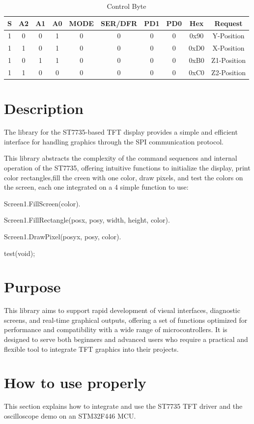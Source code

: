 \documentclass[pdflatex,sn-mathphys-num]{sn-jnl}%
\begin{document}
\begin{table}[!h]
	\centering
	\caption{Control Byte}
	\begin{tabular}{cccccccc|c|c}
		S & A2 & A1 & A0 & MODE & SER/DFR & PD1 & PD0 & Hex & Request\\ 
        \hline
		1 & 0 & 0 & 1 & 0 & 0 & 0 & 0&0x90 & Y-Position\\ 
		1 & 1 & 0 & 1 & 0 & 0 & 0 & 0&0xD0 & X-Position\\ 
		1 & 0 & 1 & 1 & 0 & 0 & 0 & 0&0xB0 & Z1-Position\\ 
		1 & 1 & 0 & 0 & 0 & 0 & 0 & 0&0xC0 & Z2-Position\\ 
	\end{tabular}
\end{table}

\newpage
\section{Description}
The library for the ST7735-based TFT display provides a simple and efficient interface for handling graphics through the SPI communication protocol. 

This library abstracts the complexity of the command sequences and internal operation of the ST7735, offering intuitive functions to initialize the display, print color rectangles,fill the creen with one color, draw pixels, and test the colors on the screen, each one integrated on a 4 simple function to use:

Screen1.FillScreen(color).

Screen1.FillRectangle(posx, posy, width, height, color).

Screen1.DrawPixel(posyx, posy, color).

test(void);

\section{Purpose}
This library aims to support rapid development of visual interfaces, diagnostic screens, and real-time graphical outputs, offering a set of functions optimized for performance and compatibility with a wide range of microcontrollers. It is designed to serve both beginners and advanced users who require a practical and flexible tool to integrate TFT graphics into their projects.

\section{How to use properly}
This section explains how to integrate and use the ST7735 TFT driver and the oscilloscope demo on an STM32F446 MCU.
\end{document}
